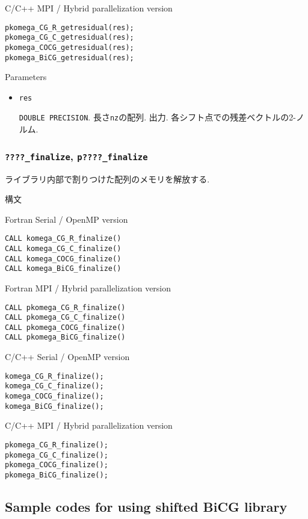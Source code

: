 \documentclass[12pt,titlepage]{article}
\begin{document}
\noindent C/C++ MPI / Hybrid parallelization version
\begin{verbatim}
pkomega_CG_R_getresidual(res);
pkomega_CG_C_getresidual(res);
pkomega_COCG_getresidual(res);
pkomega_BiCG_getresidual(res);
\end{verbatim}

\noindent Parameters

\begin{itemize}
  
\item \verb|res|

  \verb|DOUBLE PRECISION|.
  長さ\verb|nz|の配列. 出力.
  各シフト点での残差ベクトルの2-ノルム.

\end{itemize}

\subsubsection{\texttt{????\_finalize}, \texttt{p????\_finalize}}

ライブラリ内部で割りつけた配列のメモリを解放する.

\noindent 構文

\noindent Fortran Serial / OpenMP version
\begin{verbatim}
CALL komega_CG_R_finalize()
CALL komega_CG_C_finalize()
CALL komega_COCG_finalize()
CALL komega_BiCG_finalize()
\end{verbatim}

\noindent Fortran MPI / Hybrid parallelization version
\begin{verbatim}
CALL pkomega_CG_R_finalize()
CALL pkomega_CG_C_finalize()
CALL pkomega_COCG_finalize()
CALL pkomega_BiCG_finalize()
\end{verbatim}

\noindent C/C++ Serial / OpenMP version
\begin{verbatim}
komega_CG_R_finalize();
komega_CG_C_finalize();
komega_COCG_finalize();
komega_BiCG_finalize();
\end{verbatim}

\noindent C/C++ MPI / Hybrid parallelization version
\begin{verbatim}
pkomega_CG_R_finalize();
pkomega_CG_C_finalize();
pkomega_COCG_finalize();
pkomega_BiCG_finalize();
\end{verbatim}


\subsection{Sample codes for using shifted BiCG library}
\end{document}

